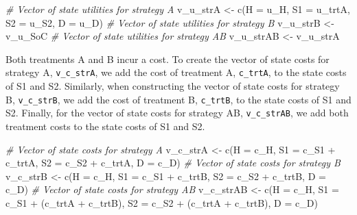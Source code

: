 \documentclass[
]{article}
\newenvironment{Shaded}{\begin{snugshade}}{\end{snugshade}}
\newcommand{\AttributeTok}[1]{\textcolor[rgb]{0.77,0.63,0.00}{#1}}
\newcommand{\CommentTok}[1]{\textcolor[rgb]{0.56,0.35,0.01}{\textit{#1}}}
\newcommand{\FunctionTok}[1]{\textcolor[rgb]{0.00,0.00,0.00}{#1}}
\newcommand{\NormalTok}[1]{#1}
\newcommand{\OtherTok}[1]{\textcolor[rgb]{0.56,0.35,0.01}{#1}}
\newcommand{\SpecialCharTok}[1]{\textcolor[rgb]{0.00,0.00,0.00}{#1}}
\begin{document}
\begin{Shaded}
\begin{Highlighting}[]
\CommentTok{\# Vector of state utilities for strategy A}
\NormalTok{v\_u\_strA }\OtherTok{\textless{}{-}} \FunctionTok{c}\NormalTok{(}\AttributeTok{H =}\NormalTok{ u\_H, }\AttributeTok{S1 =}\NormalTok{ u\_trtA, }\AttributeTok{S2 =}\NormalTok{ u\_S2, }\AttributeTok{D =}\NormalTok{ u\_D)}
\CommentTok{\# Vector of state utilities for strategy B}
\NormalTok{v\_u\_strB }\OtherTok{\textless{}{-}}\NormalTok{ v\_u\_SoC}
\CommentTok{\# Vector of state utilities for strategy AB}
\NormalTok{v\_u\_strAB }\OtherTok{\textless{}{-}}\NormalTok{ v\_u\_strA}
\end{Highlighting}
\end{Shaded}

Both treatments A and B incur a cost. To create the vector of state costs for strategy A, \texttt{v\_c\_strA}, we add the cost of treatment A, \texttt{c\_trtA}, to the state costs of S1 and S2. Similarly, when constructing the vector of state costs for strategy B, \texttt{v\_c\_strB}, we add the cost of treatment B, \texttt{c\_trtB}, to the state costs of S1 and S2. Finally, for the vector of state costs for strategy AB, \texttt{v\_c\_strAB}, we add both treatment costs to the state costs of S1 and S2.

\begin{Shaded}
\begin{Highlighting}[]
\CommentTok{\# Vector of state costs for strategy A}
\NormalTok{v\_c\_strA }\OtherTok{\textless{}{-}} \FunctionTok{c}\NormalTok{(}\AttributeTok{H  =}\NormalTok{ c\_H, }
              \AttributeTok{S1 =}\NormalTok{ c\_S1 }\SpecialCharTok{+}\NormalTok{ c\_trtA, }
              \AttributeTok{S2 =}\NormalTok{ c\_S2 }\SpecialCharTok{+}\NormalTok{ c\_trtA, }
              \AttributeTok{D  =}\NormalTok{ c\_D)}
\CommentTok{\# Vector of state costs for strategy B}
\NormalTok{v\_c\_strB }\OtherTok{\textless{}{-}} \FunctionTok{c}\NormalTok{(}\AttributeTok{H  =}\NormalTok{ c\_H, }
              \AttributeTok{S1 =}\NormalTok{ c\_S1 }\SpecialCharTok{+}\NormalTok{ c\_trtB, }
              \AttributeTok{S2 =}\NormalTok{ c\_S2 }\SpecialCharTok{+}\NormalTok{ c\_trtB, }
              \AttributeTok{D  =}\NormalTok{ c\_D)}
\CommentTok{\# Vector of state costs for strategy AB}
\NormalTok{v\_c\_strAB }\OtherTok{\textless{}{-}} \FunctionTok{c}\NormalTok{(}\AttributeTok{H  =}\NormalTok{ c\_H, }
               \AttributeTok{S1 =}\NormalTok{ c\_S1 }\SpecialCharTok{+}\NormalTok{ (c\_trtA }\SpecialCharTok{+}\NormalTok{ c\_trtB), }
               \AttributeTok{S2 =}\NormalTok{ c\_S2 }\SpecialCharTok{+}\NormalTok{ (c\_trtA }\SpecialCharTok{+}\NormalTok{ c\_trtB), }
               \AttributeTok{D  =}\NormalTok{ c\_D)}
\end{Highlighting}
\end{Shaded}
\end{document}
